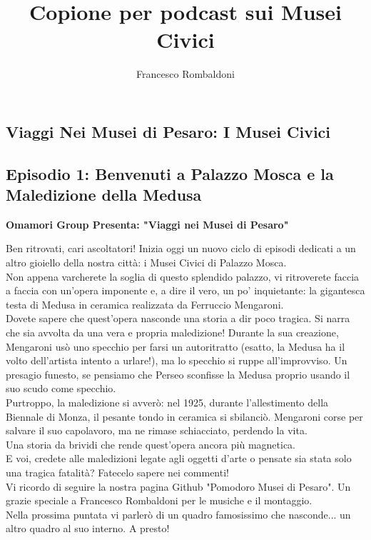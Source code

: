 \documentclass[hidelinks,12pt,a4paper]{article}
\begin{document}
	\begin{flushleft}
		
		\title{\textbf{Copione per podcast sui Musei Civici}}
		\author{Francesco Rombaldoni}
		\date{}
		
		\maketitle
		
		\setcounter{page}{1}
		\newpage
		
		\tableofcontents
		\newpage
		
		
		\section{Viaggi Nei Musei di Pesaro: I Musei Civici}
		
		\subsection{Episodio 1: Benvenuti a Palazzo Mosca e la Maledizione della Medusa}
		\begin{center}
			\textbf{Omamori Group Presenta: "Viaggi nei Musei di Pesaro"}
		\end{center}
		Ben ritrovati, cari ascoltatori! Inizia oggi un nuovo ciclo di episodi dedicati a un altro gioiello della nostra città: i Musei Civici di Palazzo Mosca.\\
		Non appena varcherete la soglia di questo splendido palazzo, vi ritroverete faccia a faccia con un'opera imponente e, a dire il vero, un po' inquietante: la gigantesca testa di Medusa in ceramica realizzata da Ferruccio Mengaroni.\\
		Dovete sapere che quest'opera nasconde una storia a dir poco tragica. Si narra che sia avvolta da una vera e propria maledizione! Durante la sua creazione, Mengaroni usò uno specchio per farsi un autoritratto (esatto, la Medusa ha il volto dell'artista intento a urlare!), ma lo specchio si ruppe all'improvviso. Un presagio funesto, se pensiamo che Perseo sconfisse la Medusa proprio usando il suo scudo come specchio.\\
		Purtroppo, la maledizione si avverò: nel 1925, durante l'allestimento della Biennale di Monza, il pesante tondo in ceramica si sbilanciò. Mengaroni corse per salvare il suo capolavoro, ma ne rimase schiacciato, perdendo la vita.\\
		Una storia da brividi che rende quest'opera ancora più magnetica.\\
		E voi, credete alle maledizioni legate agli oggetti d'arte o pensate sia stata solo una tragica fatalità? Fatecelo sapere nei commenti!\\
		Vi ricordo di seguire la nostra pagina Github "Pomodoro Musei di Pesaro". Un grazie speciale a Francesco Rombaldoni per le musiche e il montaggio.\\
		Nella prossima puntata vi parlerò di un quadro famosissimo che nasconde... un altro quadro al suo interno. A presto!\\
		

\end{flushleft}
\end{document}
